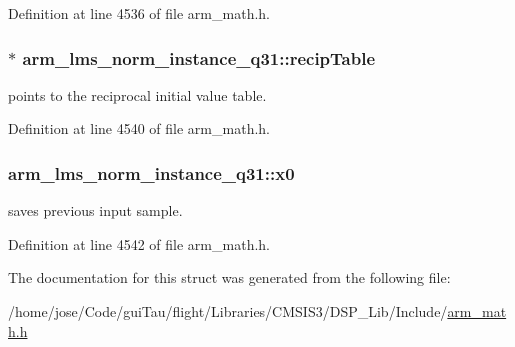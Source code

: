 Definition at line 4536 of file arm\-\_\-math.\-h.

\hypertarget{structarm__lms__norm__instance__q31_a85836d0907077b9ac660f7bbbaa9d694}{
\subsubsection[{recip\-Table}]{$\ast$ arm\-\_\-lms\-\_\-norm\-\_\-instance\-\_\-q31\-::recip\-Table}}\label{structarm__lms__norm__instance__q31_a85836d0907077b9ac660f7bbbaa9d694}
points to the reciprocal initial value table. 

Definition at line 4540 of file arm\-\_\-math.\-h.

\hypertarget{structarm__lms__norm__instance__q31_a47c4466d644e0d8ba407995adfa9b917}{
\subsubsection[{x0}]{ arm\-\_\-lms\-\_\-norm\-\_\-instance\-\_\-q31\-::x0}}\label{structarm__lms__norm__instance__q31_a47c4466d644e0d8ba407995adfa9b917}
saves previous input sample. 

Definition at line 4542 of file arm\-\_\-math.\-h.



The documentation for this struct was generated from the following file\-:\begin{DoxyCompactItemize}
\item 
/home/jose/\-Code/gui\-Tau/flight/\-Libraries/\-C\-M\-S\-I\-S3/\-D\-S\-P\-\_\-\-Lib/\-Include/\hyperlink{arm__math_8h}{arm\-\_\-math.\-h}\end{DoxyCompactItemize}
